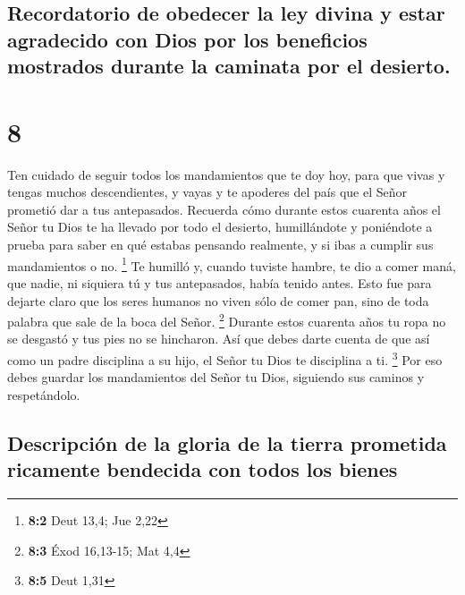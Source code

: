 \hypertarget{recordatorio-de-obedecer-la-ley-divina-y-estar-agradecido-con-dios-por-los-beneficios-mostrados-durante-la-caminata-por-el-desierto.}{%
\subsection{Recordatorio de obedecer la ley divina y estar agradecido
con Dios por los beneficios mostrados durante la caminata por el
desierto.}\label{recordatorio-de-obedecer-la-ley-divina-y-estar-agradecido-con-dios-por-los-beneficios-mostrados-durante-la-caminata-por-el-desierto.}}

\hypertarget{section-7}{%
\section{8}\label{section-7}}

 Ten cuidado de seguir todos los mandamientos que te doy
hoy, para que vivas y tengas muchos descendientes, y vayas y te apoderes
del país que el Señor prometió dar a tus antepasados. 
Recuerda cómo durante estos cuarenta años el Señor tu Dios te ha llevado
por todo el desierto, humillándote y poniéndote a prueba para saber en
qué estabas pensando realmente, y si ibas a cumplir sus mandamientos o
no. \footnote{\textbf{8:2} Deut 13,4; Jue 2,22}  Te
humilló y, cuando tuviste hambre, te dio a comer maná, que nadie, ni
siquiera tú y tus antepasados, había tenido antes. Esto fue para dejarte
claro que los seres humanos no viven sólo de comer pan, sino de toda
palabra que sale de la boca del Señor. \footnote{\textbf{8:3} Éxod
  16,13-15; Mat 4,4}  Durante estos cuarenta años tu ropa
no se desgastó y tus pies no se hincharon.  Así que debes
darte cuenta de que así como un padre disciplina a su hijo, el Señor tu
Dios te disciplina a ti. \footnote{\textbf{8:5} Deut 1,31}
 Por eso debes guardar los mandamientos del Señor tu Dios,
siguiendo sus caminos y respetándolo.

\hypertarget{descripciuxf3n-de-la-gloria-de-la-tierra-prometida-ricamente-bendecida-con-todos-los-bienes}{%
\subsection{Descripción de la gloria de la tierra prometida ricamente
bendecida con todos los
bienes}\label{descripciuxf3n-de-la-gloria-de-la-tierra-prometida-ricamente-bendecida-con-todos-los-bienes}}

